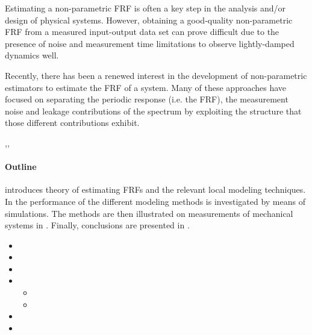 Estimating a non-parametric \gls{FRF} is often a key step in the analysis and/or design of physical systems.
However, obtaining a good-quality non-parametric \gls{FRF} from a measured input-output data set can prove difficult due to the presence of noise and measurement time limitations to observe lightly-damped dynamics well.

Recently, there has been a renewed interest in the development of non-parametric estimators to estimate the \gls{FRF} of a system.
Many of these approaches have focused on separating the periodic response (i.e. the \gls{FRF}), the measurement noise and leakage contributions of the spectrum by exploiting the structure that those different contributions exhibit.


\citep{Pintelon2010LPM1},\citep{Pintelon2010LPM2},\citep{McKelvey2012LRM}



\paragraph*{Outline}
 introduces theory of estimating \glspl{FRF} and the relevant local modeling techniques.
In  the performance of the different modeling methods is investigated by means of simulations.
The methods are then illustrated on measurements of mechanical systems in .
Finally, conclusions are presented in .


\begin{itemize}
    \item {}
    \item {}
    \item {}
    \item {}
      \begin{itemize}
        \item {}
        \item {}
      \end{itemize}
    \item {}
    \item {}
\end{itemize}

